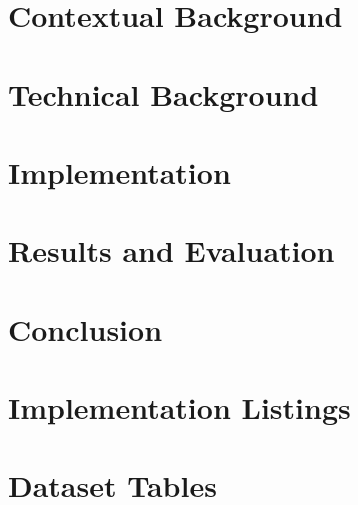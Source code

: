\documentclass[ %
                author={Ainsley Rutterford},
                supervisor={Dr. Tilo Burghardt},
                degree={MEng},
                title={Volumetric Coral Analysis using Deep Learning},
                subtitle={},
                type={research},
                year={2020} ]{dissertation}
\begin{document}
\mainmatter

\chapter{Contextual Background}
\label{chap:context}


\chapter{Technical Background}
\label{chap:technical}


\chapter{Implementation}
\label{chap:implementation}


\chapter{Results and Evaluation}
\label{chap:evaluation}


\chapter{Conclusion}
\label{chap:conclusion}


\backmatter



\appendix

\chapter{Implementation Listings}
\label{appx:implementationlistings}


\chapter{Dataset Tables}
\label{appx:datasettables}
% 
\end{document}
